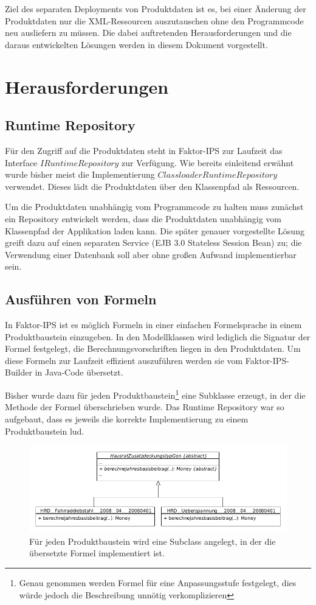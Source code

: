 \documentclass[headsepline=true, footsepline=true]{scrartcl}
\begin{document}
Ziel des separaten Deployments von Produktdaten ist es, bei einer Änderung der
Produktdaten nur die XML-Ressourcen auszutauschen ohne den Programmcode neu
ausliefern zu müssen. Die dabei auftretenden Herausforderungen und
die daraus entwickelten Lösungen werden in diesem Dokument vorgestellt.

\section{Herausforderungen}

\subsection{Runtime Repository}

Für den Zugriff auf die Produktdaten steht in Faktor-IPS zur Laufzeit das
Interface $IRuntimeRepository$ zur Verfügung. Wie bereits einleitend
erwähnt wurde bisher meist die Implementierung
$ClassloaderRuntimeRepository$ verwendet. Dieses lädt die Produktdaten über den
Klassenpfad als Ressourcen.

Um die Produktdaten unabhängig vom Programmcode zu halten muss zunächst ein
Repository entwickelt werden, dass die Produktdaten unabhängig vom Klassenpfad
der Applikation laden kann. Die später genauer vorgestellte Lösung greift dazu
auf einen separaten Service (EJB 3.0 Stateless Session Bean) zu; die Verwendung einer
Datenbank soll aber ohne großen Aufwand implementierbar sein.

\subsection{Ausführen von Formeln}

In Faktor-IPS ist es möglich Formeln in einer einfachen Formelsprache in einem
Produktbaustein einzugeben. In den Modellklassen wird lediglich die Signatur der
Formel festgelegt, die Berechnungsvorschriften liegen in den Produktdaten. Um
diese Formeln zur Laufzeit effizient auszuführen werden sie vom
Faktor-IPS-Builder in Java-Code übersetzt.

Bisher wurde dazu für jeden Produktbaustein\footnote{Genau genommen werden
Formel für eine Anpassungsstufe festgelegt, dies würde jedoch die Beschreibung
unnötig verkomplizieren} eine Subklasse erzeugt, in der die Methode der Formel
überschrieben wurde. Das Runtime Repository war so aufgebaut, dass es jeweils die
korrekte Implementierung zu einem Produktbaustein lud.

\begin{figure}[htb] \centering
\includegraphics[width=13cm]{./pics/subclassing.png}
\caption{Für jeden Produktbaustein wird eine Subclass angelegt, in der die
übersetzte Formel implementiert ist.}
\label{subclassing}
\end{figure}
\end{document}
